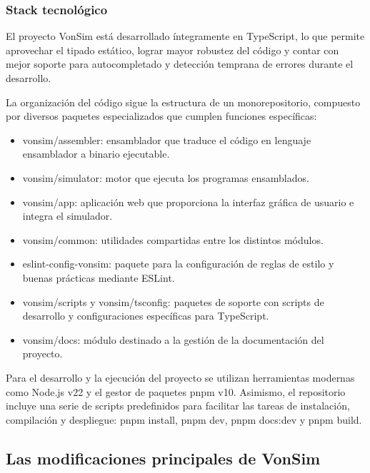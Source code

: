 \documentclass[12pt,oneside]{templates/unerthesis}
\providecommand{\tightlist}{%
  \setlength{\itemsep}{0pt}\setlength{\parskip}{0pt}}
\begin{document}
\hypertarget{stack-tecnoluxf3gico}{%
\subsubsection{Stack tecnológico}\label{stack-tecnoluxf3gico}}

El proyecto VonSim está desarrollado íntegramente en TypeScript, lo que permite aprovechar el tipado estático, lograr mayor robustez del código y contar con mejor soporte para autocompletado y detección temprana de errores durante el desarrollo.

La organización del código sigue la estructura de un monorepositorio, compuesto por diversos paquetes especializados que cumplen funciones específicas:

\begin{itemize}
\tightlist
\item
  vonsim/assembler: ensamblador que traduce el código en lenguaje ensamblador a binario ejecutable.
\item
  vonsim/simulator: motor que ejecuta los programas ensamblados.
\item
  vonsim/app: aplicación web que proporciona la interfaz gráfica de usuario e integra el simulador.
\item
  vonsim/common: utilidades compartidas entre los distintos módulos.
\item
  eslint-config-vonsim: paquete para la configuración de reglas de estilo y buenas prácticas mediante ESLint.
\item
  vonsim/scripts y vonsim/tsconfig: paquetes de soporte con scripts de desarrollo y configuraciones específicas para TypeScript.
\item
  vonsim/docs: módulo destinado a la gestión de la documentación del proyecto.
\end{itemize}

Para el desarrollo y la ejecución del proyecto se utilizan herramientas modernas como Node.js v22 y el gestor de paquetes pnpm v10. Asimismo, el repositorio incluye una serie de scripts predefinidos para facilitar las tareas de instalación, compilación y despliegue: pnpm install, pnpm dev, pnpm docs:dev y pnpm build.

\hypertarget{las-modificaciones-principales-de-vonsim}{%
\subsection{Las modificaciones principales de VonSim}\label{las-modificaciones-principales-de-vonsim}}
\end{document}
